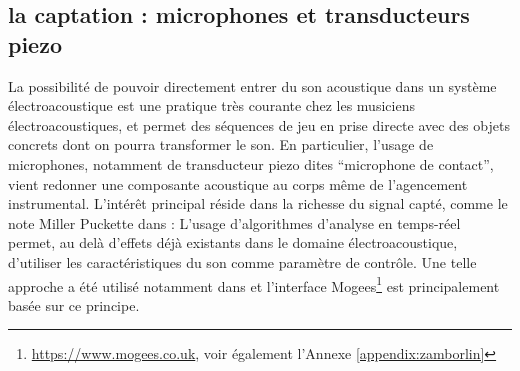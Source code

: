 \subsection{la captation : microphones et transducteurs piezo}

\noindent La possibilité de pouvoir directement entrer du son acoustique dans un système électroacoustique est une pratique très courante chez les musiciens électroacoustiques, et permet des séquences de jeu en prise directe avec des objets concrets dont on pourra transformer le son. En particulier, l'usage de microphones, notamment de transducteur piezo dites ``microphone de contact'', vient redonner une composante acoustique au corps même de l'agencement instrumental. L'intérêt principal réside dans la richesse du signal capté, comme le note Miller Puckette dans \cite{puckette_infuriating_2011}:  L'usage d'algorithmes d'analyse en temps-réel permet, au delà d'effets déjà existants dans le domaine électroacoustique, d'utiliser les caractéristiques du son comme paramètre de contrôle. Une telle approche a été utilisé notamment dans \cite{schwarz_rich_2014} et l'interface Mogees\footnote{\url{https://www.mogees.co.uk}, voir également l'Annexe \ref{appendix:zamborlin}} est principalement basée sur ce principe. 



